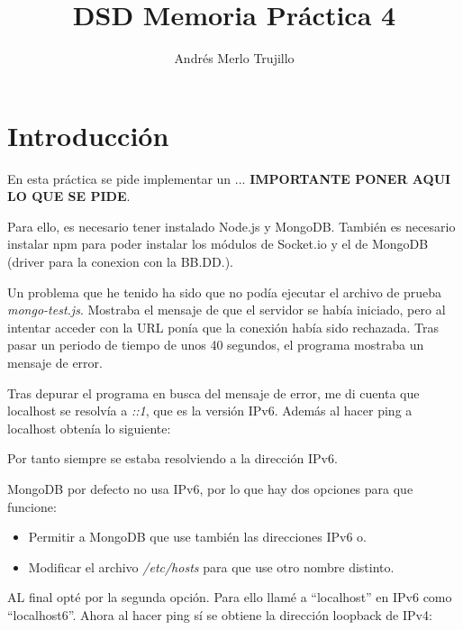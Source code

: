 \documentclass{article}
\title{DSD Memoria Práctica 4}
\author{Andrés Merlo Trujillo}
\date{}
\begin{document}
\maketitle

\tableofcontents

\newpage

\section{Introducción}
En esta práctica se pide implementar un ... \textbf{IMPORTANTE PONER AQUI LO QUE SE PIDE}.

Para ello, es necesario tener instalado Node.js y MongoDB. También es necesario instalar npm para poder instalar los módulos de Socket.io y el de MongoDB (driver para la conexion con la BB.DD.).

Un problema que he tenido ha sido que no podía ejecutar el archivo de prueba \textit{mongo-test.js}. Mostraba el mensaje de que el servidor se había iniciado, pero al intentar acceder con la URL ponía que la conexión había sido rechazada. Tras pasar un periodo de tiempo de unos 40 segundos, el programa mostraba un mensaje de error.


Tras depurar el programa en busca del mensaje de error, me di cuenta que localhost se resolvía a \textit{::1}, que es la versión IPv6. Además al hacer ping a localhost obtenía lo siguiente:


Por tanto siempre se estaba resolviendo a la dirección IPv6.

MongoDB por defecto no usa IPv6, por lo que hay dos opciones para que funcione:

\begin{itemize}
    \item Permitir a MongoDB que use también las direcciones IPv6 o.
    
    \item Modificar el archivo \textit{/etc/hosts} para que use otro nombre distinto.
\end{itemize}

AL final opté por la segunda opción. Para ello llamé a ``localhost'' en IPv6 como ``localhost6''. Ahora al hacer ping sí se obtiene la dirección loopback de IPv4:

\end{document}
